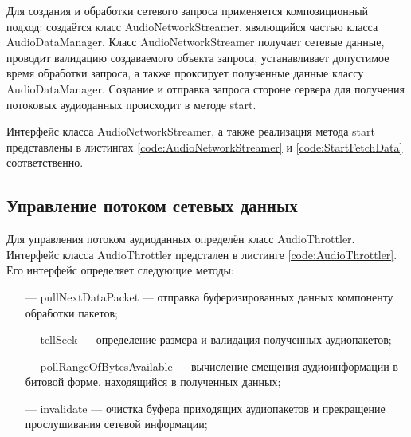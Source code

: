         \par Для создания и обработки сетевого запроса применяется композиционный подход: 
        создаётся класс AudioNetworkStreamer, явялющийся частью класса AudioDataManager.
        Класс AudioNetworkStreamer получает сетевые данные, проводит валидацию создаваемого объекта запроса, 
        устанавливает допустимое время обработки запроса, а также проксирует полученные данные классу \newline AudioDataManager.
        Создание и отправка запроса стороне сервера для получения потоковых аудиоданных происходит в методе start.
        
        \par Интерфейс класса AudioNetworkStreamer, а также реализация метода start представлены 
        в листингах \ref{code:AudioNetworkStreamer} и \ref{code:StartFetchData} соответственно.

        
        


    \subsection{Управление потоком сетевых данных}
        \par Для управления потоком аудиоданных определён класс AudioThrottler.
        Интерфейс класса AudioThrottler предстален в листинге \ref{code:AudioThrottler}. 
        Его интерфейс определяет следующие методы:
        \begin{itemize}
            \item[---] pullNextDataPacket --- отправка буферизированных данных компоненту обработки пакетов;
            \item[---] tellSeek --- определение размера и валидация полученных аудиопакетов;
            \item[---] pollRangeOfBytesAvailable --- вычисление смещения аудиоинформации в битовой форме, находящийся в полученных данных;
            \item[---] invalidate --- очистка буфера приходящих аудиопакетов и прекращение прослушивания сетевой информации;
        \end{itemize}

        

